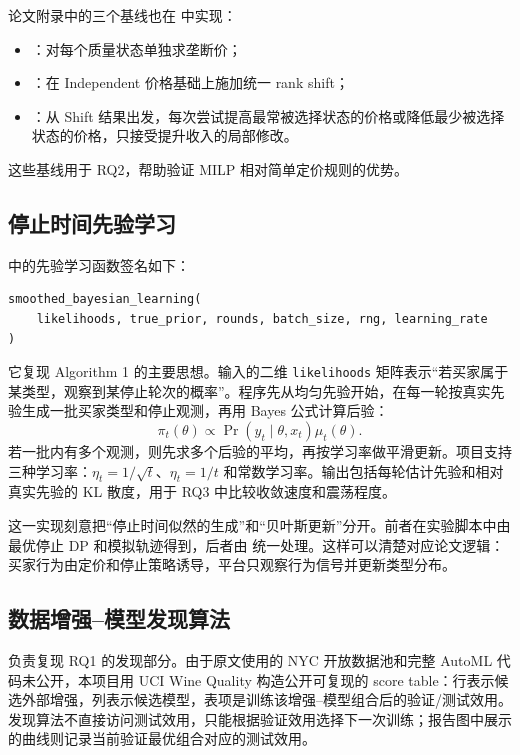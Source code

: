 \documentclass[11pt,a4paper]{ctexart}
\theoremstyle{definition}
\begin{document}
论文附录中的三个基线也在  中实现：
\begin{itemize}
\item {}：对每个质量状态单独求垄断价；
\item {}：在 Independent 价格基础上施加统一 rank shift；
\item {}：从 Shift 结果出发，每次尝试提高最常被选择状态的价格或降低最少被选择状态的价格，只接受提升收入的局部修改。
\end{itemize}
这些基线用于 RQ2，帮助验证 MILP 相对简单定价规则的优势。

\subsection{停止时间先验学习}

 中的先验学习函数签名如下：
\begin{lstlisting}[language=Python]
smoothed_bayesian_learning(
    likelihoods, true_prior, rounds, batch_size, rng, learning_rate
)
\end{lstlisting}
它复现 Algorithm 1 的主要思想。输入的二维 \texttt{likelihoods} 矩阵表示“若买家属于某类型，观察到某停止轮次的概率”。程序先从均匀先验开始，在每一轮按真实先验生成一批买家类型和停止观测，再用 Bayes 公式计算后验：
\[
\pi_t(\theta)\propto \Pr(y_t\mid\theta,x_t)\mu_t(\theta).
\]
若一批内有多个观测，则先求多个后验的平均，再按学习率做平滑更新。项目支持三种学习率：$\eta_t=1/\sqrt t$、$\eta_t=1/t$ 和常数学习率。输出包括每轮估计先验和相对真实先验的 KL 散度，用于 RQ3 中比较收敛速度和震荡程度。

这一实现刻意把“停止时间似然的生成”和“贝叶斯更新”分开。前者在实验脚本中由最优停止 DP 和模拟轨迹得到，后者由  统一处理。这样可以清楚对应论文逻辑：买家行为由定价和停止策略诱导，平台只观察行为信号并更新类型分布。

\subsection{数据增强--模型发现算法}

 负责复现 RQ1 的发现部分。由于原文使用的 NYC 开放数据池和完整 AutoML 代码未公开，本项目用 UCI Wine Quality 构造公开可复现的 score table：行表示候选外部增强，列表示候选模型，表项是训练该增强--模型组合后的验证/测试效用。发现算法不直接访问测试效用，只能根据验证效用选择下一次训练；报告图中展示的曲线则记录当前验证最优组合对应的测试效用。
\end{document}
